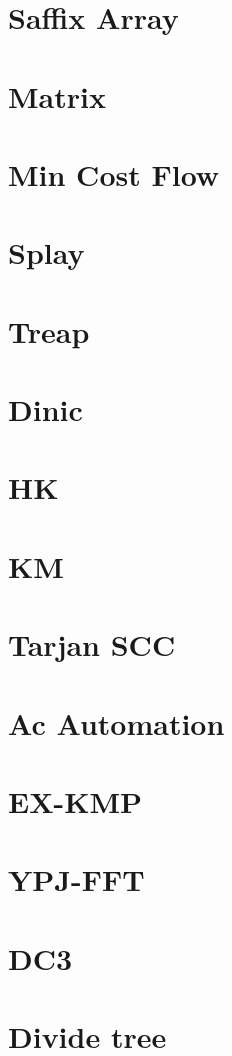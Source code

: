 \documentclass[10pt, a4paper]{article}
\begin{document}
	\section{Saffix Array}
	
	\section{Matrix}
	
	\section{Min Cost Flow}
	
	\section{Splay}
	
	\section{Treap}
	
	\section{Dinic}
	
	\section{HK}
	
	\section{KM}
	
	\section{Tarjan SCC}
	
	\section{Ac Automation}
	
	\section{EX-KMP}
	
	\section{YPJ-FFT}
	
	\section{DC3}
	
	\section{Divide tree}
	
\begin{multicols}{2}


\end{multicols}
\end{document}
